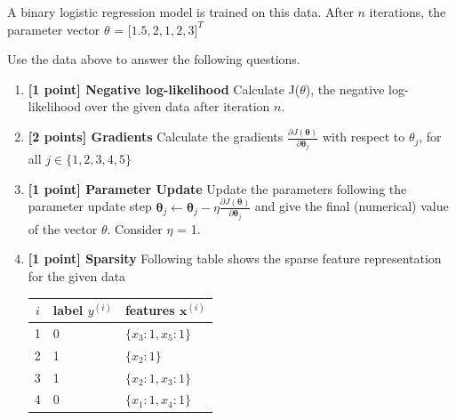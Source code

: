 \documentclass[11pt]{article}
\numberwithin{equation}{section} %
\numberwithin{figure}{section} %
\numberwithin{table}{section} %
\newcommand{\xv}{\mathbf{x}}
\newcommand{\thetav     }{\boldsymbol \theta     }
\begin{document}
A binary logistic regression model is trained on this data. After $n$ iterations, the parameter vector $\theta$ = $\lbrack 1.5, 2, 1, 2, 3 \rbrack^T$

Use the data above to answer the following questions. 
 \begin{enumerate}
     \item {\bf  [1 point] Negative log-likelihood} Calculate J($\theta$), the negative log-likelihood over the given data after iteration $n$. 
     \begin{solution}
    \bigskip \bigskip \bigskip \bigskip \bigskip \bigskip \bigskip \bigskip
    \bigskip \bigskip \bigskip \bigskip \bigskip \bigskip \bigskip \bigskip
    \end{solution}
    
    \clearpage
    
     \item {\bf [2 points] Gradients} Calculate the gradients $\frac{\partial J(\thetav)}{\partial \thetav_j}$ with respect to $\theta_{j}$, for all $j \in \{1, 2, 3, 4, 5\}$
      \begin{solution}
    \bigskip \bigskip \bigskip \bigskip \bigskip \bigskip \bigskip \bigskip
    \bigskip \bigskip \bigskip \bigskip \bigskip \bigskip \bigskip \bigskip
    \bigskip \bigskip \bigskip \bigskip \bigskip \bigskip \bigskip \bigskip
    \bigskip \bigskip \bigskip \bigskip \bigskip \bigskip \bigskip \bigskip
    \bigskip \bigskip \bigskip \bigskip \bigskip \bigskip \bigskip \bigskip
    \end{solution}
    
    
    \clearpage
     \item {\bf [1 point] Parameter Update} Update the parameters following the parameter update step $\thetav_j \leftarrow \thetav_j - \eta \frac{\partial J(\thetav)}{\partial \thetav_j}$ and give the final (numerical) value of the vector $\theta$. Consider $\eta$ = 1.
     \begin{solution}
    \bigskip \bigskip \bigskip \bigskip \bigskip \bigskip \bigskip \bigskip
    \bigskip \bigskip \bigskip \bigskip \bigskip \bigskip \bigskip \bigskip
    \bigskip \bigskip \bigskip \bigskip \bigskip \bigskip \bigskip \bigskip
    \end{solution}
    
     \item {\bf  [1 point] Sparsity} Following table shows the sparse feature representation for the given data
     \begin{table}[h]
    \centering
     \begin{tabular}{cll}
    \toprule
    $i$ & {\bf label} $y^{(i)}$ & {\bf features} $\xv^{(i)}$ \\
    \midrule
    1 & 0 &  $\{ x_3: 1, x_5: 1 \}$ \\
    2 & 1 & $\{ x_2: 1 \}$ \\
    3 & 1 & $\{ x_2: 1, x_3: 1 \}$ \\
    4 & 0 & $\{ x_1: 1, x_4: 1 \}$ \\
    

\end{tabular}
\end{table}
\end{enumerate}
\end{document}
